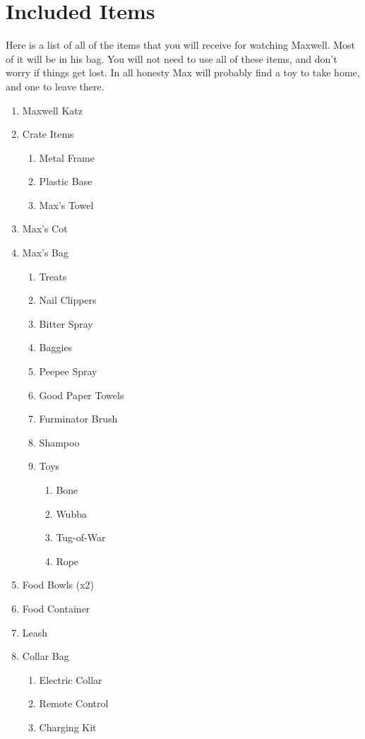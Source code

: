 \documentclass[pdftex,12pt]{article}
\begin{document}
\vspace*{\fill}

\clearpage
\newpage
\section{Included Items}

Here is a list of all of the items that you will receive for watching Maxwell.
Most of it will be in his bag. You will not need to use all of these items, and
don't worry if things get lost. In all honesty Max will probably find a toy to
take home, and one to leave there.

\begin{enumerate}\label{itm:included_items}
    \item Maxwell Katz
    \item Crate Items
        \begin{enumerate}
            \item Metal Frame
            \item Plastic Base
            \item Max's Towel
        \end{enumerate}
    \item Max's Cot
    \item Max's Bag
        \begin{enumerate}
            \item Treats
            \item Nail Clippers
            \item Bitter Spray
            \item Baggies
            \item Peepee Spray
            \item Good Paper Towels
            \item Furminator Brush
            \item Shampoo
            \item Toys
                \begin{enumerate}
                    \item Bone
                    \item Wubba
                    \item Tug-of-War
                    \item Rope
                \end{enumerate}
        \end{enumerate}
    \item Food Bowls (x2)
    \item Food Container
    \item Leash
    \item Collar Bag
        \begin{enumerate}
            \item Electric Collar
            \item Remote Control
            \item Charging Kit
        \end{enumerate}
\end{enumerate}
\end{document}
